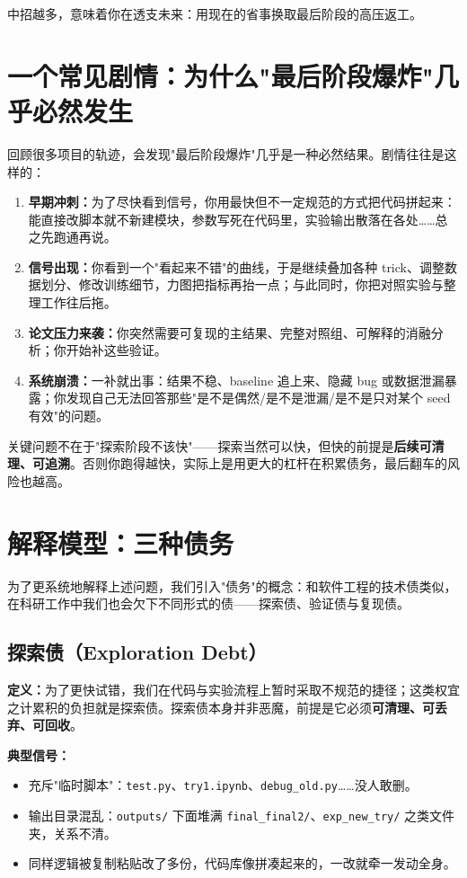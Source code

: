 中招越多，意味着你在透支未来：用现在的省事换取最后阶段的高压返工。

\section{一个常见剧情：为什么"最后阶段爆炸"几乎必然发生}
回顾很多项目的轨迹，会发现"最后阶段爆炸"几乎是一种必然结果。剧情往往是这样的：
\begin{enumerate}
  \item \textbf{早期冲刺：}为了尽快看到信号，你用最快但不一定规范的方式把代码拼起来：能直接改脚本就不新建模块，参数写死在代码里，实验输出散落在各处……总之先跑通再说。
  \item \textbf{信号出现：}你看到一个"看起来不错"的曲线，于是继续叠加各种 trick、调整数据划分、修改训练细节，力图把指标再抬一点；与此同时，你把对照实验与整理工作往后拖。
  \item \textbf{论文压力来袭：}你突然需要可复现的主结果、完整对照组、可解释的消融分析；你开始补这些验证。
  \item \textbf{系统崩溃：}一补就出事：结果不稳、baseline 追上来、隐藏 bug 或数据泄漏暴露；你发现自己无法回答那些"是不是偶然/是不是泄漏/是不是只对某个 seed 有效"的问题。
\end{enumerate}

关键问题不在于"探索阶段不该快"——探索当然可以快，但快的前提是\textbf{后续可清理、可追溯}。否则你跑得越快，实际上是用更大的杠杆在积累债务，最后翻车的风险也越高。

\section{解释模型：三种债务}
为了更系统地解释上述问题，我们引入"债务"的概念：和软件工程的技术债类似，在科研工作中我们也会欠下不同形式的债——探索债、验证债与复现债。

\subsection{探索债（Exploration Debt）}
\textbf{定义：}为了更快试错，我们在代码与实验流程上暂时采取不规范的捷径；这类权宜之计累积的负担就是探索债。探索债本身并非恶魔，前提是它必须\textbf{可清理、可丢弃、可回收}。

\textbf{典型信号：}
\begin{itemize}
  \item 充斥"临时脚本"：\texttt{test.py}、\texttt{try1.ipynb}、\texttt{debug\_old.py}……没人敢删。
  \item 输出目录混乱：\texttt{outputs/} 下面堆满 \texttt{final\_final2/}、\texttt{exp\_new\_try/} 之类文件夹，关系不清。
  \item 同样逻辑被复制粘贴改了多份，代码库像拼凑起来的，一改就牵一发动全身。
\end{itemize}

